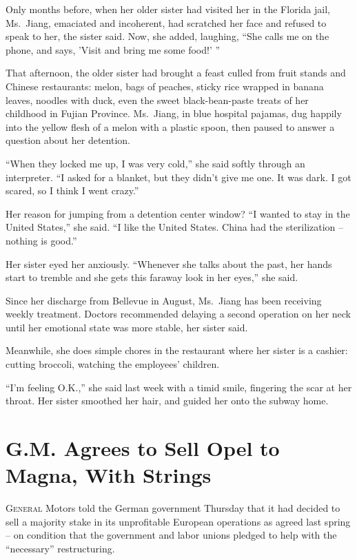 ﻿\documentclass[12pt]{article}
\begin{document}
Only months before, when her older sister had visited her in the Florida jail, Ms.~Jiang,
emaciated\cite{emaciate} and incoherent, had scratched her face and refused to speak to her, the
sister said. Now, she added, laughing, ``She calls me on the phone, and says, 'Visit and bring me
some food!' ''

That afternoon, the older sister had brought a feast culled from fruit stands and Chinese
restaurants: melon, bags of peaches, sticky rice wrapped in banana leaves, noodles with duck, even
the sweet black-bean-paste treats of her childhood in Fujian Province. Ms.~Jiang, in blue hospital
pajamas, dug happily into the yellow flesh of a melon with a plastic spoon, then paused to answer a
question about her detention.

``When they locked me up, I was very cold,'' she said softly through an interpreter. ``I asked for a
blanket, but they didn't give me one. It was dark. I got scared, so I think I went crazy.''

Her reason for jumping from a detention center window? ``I wanted to stay in the United States,''
she said. ``I like the United States. China had the sterilization -- nothing is good.''

Her sister eyed her anxiously. ``Whenever she talks about the past, her hands start to tremble and
she gets this faraway look in her eyes,'' she said.

Since her discharge from Bellevue in August, Ms.~Jiang has been receiving weekly treatment. Doctors
recommended delaying a second operation on her neck until her emotional state was more stable, her
sister said.

Meanwhile, she does simple chores in the restaurant where her sister is a cashier: cutting broccoli,
watching the employees' children.

``I'm feeling O.K.,'' she said last week with a timid smile, fingering the scar at her throat. Her
sister smoothed her hair, and guided her onto the subway home.

\section{G.M. Agrees to Sell Opel to Magna, With Strings}

\lettrine{G}{eneral} Motors told the German government Thursday that it had decided to sell a
majority stake in its unprofitable European operations as agreed last spring -- on condition that
the government and labor unions pledged to help with the ``necessary'' restructuring.
\end{document}
